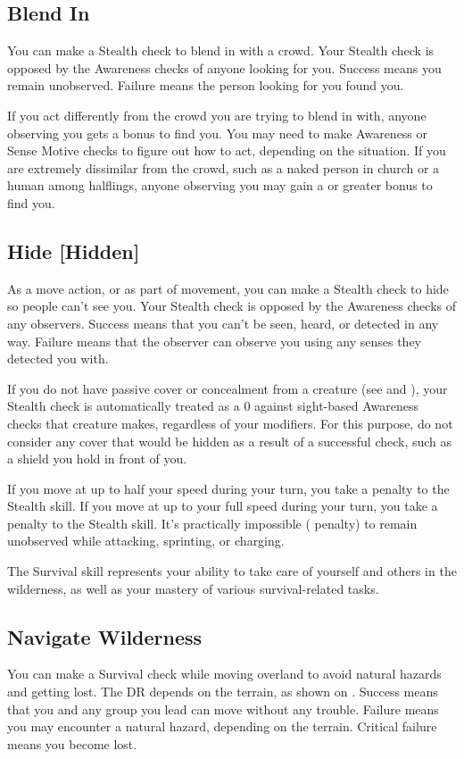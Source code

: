     \subsection{Blend In}
        You can make a Stealth check to blend in with a crowd. Your Stealth check is opposed by the Awareness checks of anyone looking for you. Success means you remain unobserved. Failure means the person looking for you found you.

        If you act differently from the crowd you are trying to blend in with, anyone observing you gets a  bonus to find you. You may need to make Awareness or Sense Motive checks to figure out how to act, depending on the situation. If you are extremely dissimilar from the crowd, such as a naked person in church or a human among halflings, anyone observing you may gain a  or greater bonus to find you.

    \subsection{Hide [Hidden]}
        As a move action, or as part of movement, you can make a Stealth check to hide so people can't see you.
        Your Stealth check is opposed by the Awareness checks of any observers.
        Success means that you can't be seen, heard, or detected in any way.
        Failure means that the observer can observe you using any senses they detected you with.

        If you do not have passive cover or concealment from a creature (see  and ), your Stealth check is automatically treated as a 0 against sight-based Awareness checks that creature makes, regardless of your modifiers.
        For this purpose, do not consider any cover that would be hidden as a result of a successful check, such as a shield you hold in front of you.

        If you move at up to half your speed during your turn, you take a  penalty to the Stealth skill.
        If you move at up to your full speed during your turn, you take a  penalty to the Stealth skill.
        It's practically impossible ( penalty) to remain unobserved while attacking, sprinting, or charging.

\newpage
{}
        The Survival skill represents your ability to take care of yourself and others in the wilderness, as well as your mastery of various survival-related tasks.

    \subsection{Navigate Wilderness}
        You can make a Survival check while moving overland to avoid natural hazards and getting lost. The DR depends on the terrain, as shown on . Success means that you and any group you lead can move without any trouble. Failure means you may encounter a natural hazard, depending on the terrain. Critical failure means you become lost.

